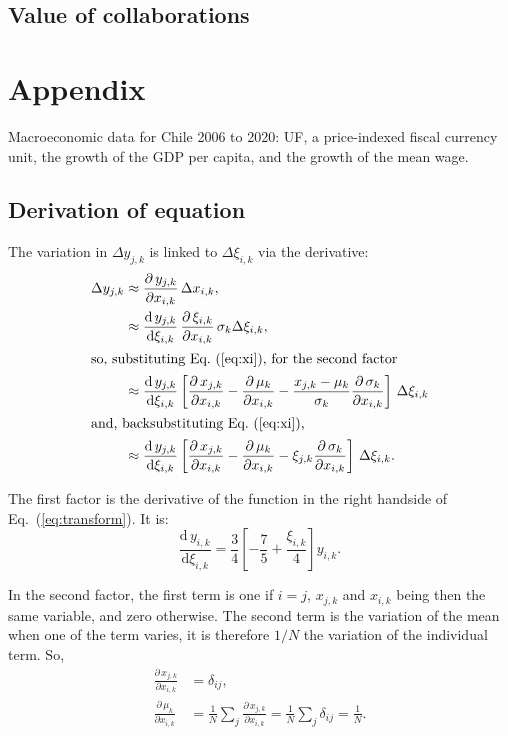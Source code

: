 \documentclass[twocolumn]{article}
\def\der#1#2{\frac{\mathrm{d}\,{#1}}{\mathrm{d}#2}}
\def\pder#1#2{\frac{\partial\,{#1}}{\partial#2}}
\def\eqref#1{Eq.~(\ref{eq:#1})}
\begin{document}
\subsection{Value of collaborations}

\appendix
\section{Appendix}
\begin{table}[t]
\centering
\caption{Macroeconomic data for Chile 2006 to 2020: UF, a price-indexed
fiscal currency unit, the growth of the GDP per capita, and the growth
of the mean wage.}
\label{tab:macro}

\end{table}
\subsection{Derivation of equation}
\label{sec:calculus}
The variation in $\Delta y_{j,k}$ is linked to $\Delta \xi_{i,k}$ via the
derivative:
\begin{align}
    \Delta y_{j,k} 
        &\approx \pder{y_{j,k}}{x_{i,k}}
                 \, \Delta x_{i,k},\\
        &\approx \der{y_{j,k}}{\xi_{i,k}}
                 \, \pder{\xi_{i,k}}{x_{i,k}}
                 \, \sigma_k \Delta \xi_{i,k},\\
\intertext{so, substituting \eqref{xi}, for the second factor}
        &\approx \der{y_{j,k}}{\xi_{i,k}}
                 \left[
                    \pder{x_{j,k}}{x_{i,k}}
                  - \pder{\mu_k}{x_{i,k}} 
                  - \frac{x_{j,k}-\mu_k}{\sigma_k}\pder{\sigma_k}{x_{i,k}} 
                 \right] 
                 \, \Delta \xi_{i,k}\\
\intertext{and, backsubstituting \eqref{xi},}
        &\approx \der{y_{j,k}}{\xi_{i,k}}
                 \left[
                    \pder{x_{j,k}}{x_{i,k}}
                  - \pder{\mu_k}{x_{i,k}}
                  - \xi_{j,k} \pder{\sigma_k}{x_{i,k}}
                 \right]
                 \, \Delta \xi_{i,k}.
\end{align}

The first factor is the derivative of the function in the right handside of Eq.~(\ref{eq:transform}). It is:
\begin{equation}
    \der{y_{i,k}}{\xi_{i,k}} = \frac34 \left[ -\frac75 + \frac{\xi_{i,k}}4 \right] y_{i,k}.
\end{equation}

In the second factor, the first term is one if $i = j$, $x_{j,k}$ and $x_{i,k}$ being then the same variable, and zero otherwise.  The second term is the variation of the mean when one of the term varies, it is therefore $1/N$ the variation of the individual term. So,
\begin{align}
    \pder{x_{j,k}}{x_{i,k}} &= \delta_{ij}, \label{eq:derx}\\
    \pder{\mu_k}{x_{i,k}}   &= \frac 1N \sum_j \pder{x_{j,k}}{x_{i,k}}
                             = \frac 1N \sum_j \delta_{ij}
                             = \frac 1N. \label{eq:dermu}
\end{align}
\end{document}
